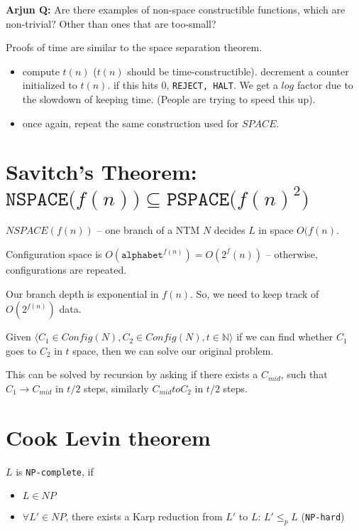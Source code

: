 \textbf{Arjun Q:} Are there examples of non-space constructible functions, which are non-trivial?
Other than ones that are too-small?


Proofs of time are similar to the space separation theorem.
\begin{itemize}
    \item compute $t(n)$ ($t(n)$ should be time-constructible).
        decrement a counter initialized to $t(n)$. if this hits $0$, 
        \texttt{REJECT, HALT}. We get a $log$ factor due to the slowdown
        of keeping time. (People are trying to speed this up).

    \item once again, repeat the same construction used for $SPACE$.
\end{itemize}

\section{Savitch's Theorem:  $\texttt{NSPACE($f(n)$)} \subseteq \texttt{PSPACE($f(n)^2$)}$}
$NSPACE(f(n))$ -- one branch of a NTM $N$ decides $L$ in space $O(f(n)$.

Configuration space is $O(\texttt{alphabet}^{f(n)}) = O(2^f(n))$ -- otherwise,
configurations are repeated.

Our branch depth is exponential in $f(n)$. So, we need to keep track of
$O(2^{f(n)})$ data.

Given $\langle C_1 \in Config(N), C_2 \in Config(N), t \in \mathbb{N} \rangle$
if we can find whether $C_1$ goes to $C_2$ in $t$ space, then we can solve
our original problem.

This can be solved by recursion by asking if there exists a $C_{mid}$, such that
$C_1 \to C_{mid}$ in $t/2$ steps, similarly $C_{mid} to C_2$ in $t/2$ steps.


\section{Cook Levin theorem}
$L$ is \texttt{NP-complete}, if 

\begin{itemize}
    \item $L \in NP$
    \item $\forall L' \in NP$, there exists a Karp reduction from $L'$ to $L$: $L' \leq_p L$ (\texttt{NP-hard})
\end{itemize}

